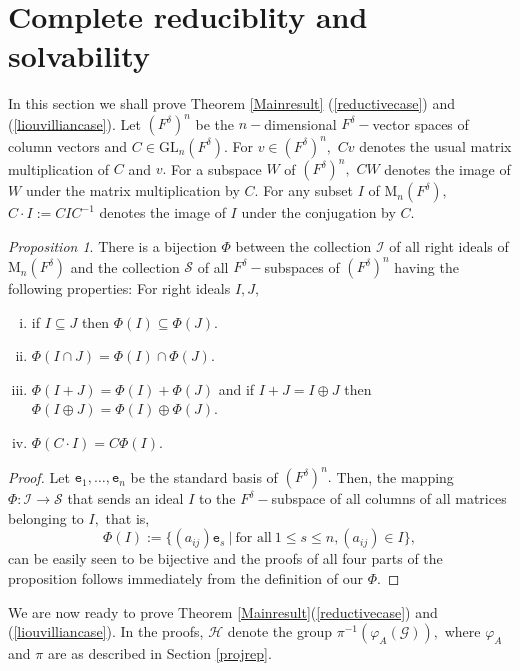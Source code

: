 \documentclass[preprint, 11pt]{amsart}
\theoremstyle{corollary}
\theoremstyle{remark}
\theoremstyle{proposition}
\newtheorem{proposition}[theorem]{Proposition}
\numberwithin{equation}{subsection}
\begin{document}
\section{Complete reduciblity and solvability} \label{reducible-solvable}

In this section we shall prove Theorem \ref{Mainresult} (\ref{reductivecase}) and (\ref{liouvilliancase}). Let $(F^\delta)^n$ be the $n-$dimensional $F^\delta-$vector spaces of column vectors and  $C\in\mathrm{GL}_n(F^\delta).$ For $v\in (F^\delta)^n,$  $Cv$ denotes the usual matrix multiplication of $C$ and $v.$ For a subspace $W$ of $(F^\delta)^n,$ $CW$ denotes the image of $W$ under the matrix multiplication by $C.$ For any subset $I$ of $\mathrm{M}_n(F^\delta),$ $C\cdot I:= CIC^{-1}$ denotes the image of $I$ under the conjugation by $C.$

\begin{proposition}\label{Phiequivalence}
	There is a bijection $\Phi$ between the collection $\mathcal I$ of all right ideals of $\mathrm{M}_n(F^\delta)$ and the collection $\mathcal S$ of all $F^\delta-$subspaces  of $(F^\delta)^n$ having the following properties: For right ideals $I, J,$ 
	\begin{enumerate}[(i)]
		\item  if $I\subseteq J$ then  $\Phi(I)\subseteq \Phi(J).$
		\item $\Phi(I\cap J)=\Phi(I)\cap \Phi(J).$ 
		\item $\Phi(I+J)=\Phi(I)+\Phi(J)$ and if $I+J=I\oplus J$ then $\Phi(I\oplus J)=\Phi(I)\oplus \Phi(J).$ 
		\item $\Phi(C\cdot I)=C\Phi(I).$
	\end{enumerate}
\end{proposition}

\begin{proof}
	Let $\mathtt{e}_{1}, \dots, \mathtt{e}_n$ be the standard basis of $(F^\delta)^n.$ Then, the mapping $\Phi: \mathcal I\to \mathcal S$ that sends an ideal $I$ to the $F^\delta-$subspace of all columns of all matrices belonging to $I,$ that is,  $$\Phi(I):=\{(a_{ij})\mathtt{e}_{s}\ | \ \text{for all}\  1\leq s\leq n, (a_{ij})\in I\},$$  can be easily seen to be  bijective and the proofs of all four parts of the proposition follows immediately from the definition of our $\Phi.$ 
\end{proof}
	

We are now ready to prove Theorem \ref{Mainresult}(\ref{reductivecase}) and (\ref{liouvilliancase}). In the proofs,   $\mathscr H$ denote the group $\pi^{-1}(\varphi_A(\mathscr G)),$ where $\varphi_A$ and $\pi$ are as described in Section \ref{projrep}.
\end{document}
